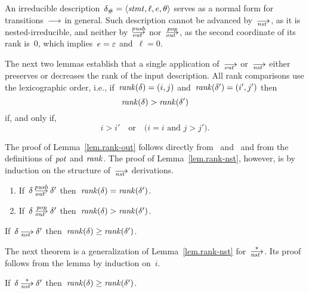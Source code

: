 An irreducible description~$\delta_\#=\<\stmt,\ell,e,\theta>$ serves as a
normal form for transitions~$\trans$ in general.  Such description cannot be
advanced by~$\nst$, as it is nested-irreducible, and neither by~$\outpush$
nor~$\outpop$, as the second coordinate of its rank is~0, which
implies~$e=\varepsilon$ and~$\ell=0$.

The next two lemmas establish that a single application of~$\out$ or~$\nst$
either preserves or decreases the rank of the input description.  All rank
comparisons use the lexicographic order, i.e., if~$\operatorname{\mathit{rank}}(\delta)=(i,j)$
and~$\operatorname{\mathit{rank}}(\delta')=(i',j')$ then
\[
  \operatorname{\mathit{rank}}(\delta)>\operatorname{\mathit{rank}}(\delta')
\]
if, and only if,
\[
  i>i'\quad\text{or}\quad\text{($i=i$ and $j>j'$)}.
\]

The proof of Lemma~\ref{lem.rank-out} follows directly from~
and~ and from the definitions of $\operatorname{\mathit{pot}}$ and $\operatorname{\mathit{rank}}$.  The proof of
Lemma~\ref{lem.rank-nst}, however, is by induction on the structure
of~$\nst$ derivations.

\begin{lemma}[label=lem.rank-out,restate=lemrankout]
  \strut
  \begin{enumerate}
  \item\label{lem.rank-out-push} If~$\delta\outpush\delta'$
    then~$\operatorname{\mathit{rank}}(\delta)=\operatorname{\mathit{rank}}(\delta')$.
  \item\label{lem.rank-out-pop} If~$\delta\outpop\delta'$
    then~$\operatorname{\mathit{rank}}(\delta)>\operatorname{\mathit{rank}}(\delta')$.
  \end{enumerate}
\end{lemma}

\begin{lemma}[label=lem.rank-nst,restate=lemranknst]
  If~$\delta\nst\delta'$ then~$\operatorname{\mathit{rank}}(\delta)\ge\operatorname{\mathit{rank}}(\delta')$.
\end{lemma}

The next theorem is a generalization of Lemma~\ref{lem.rank-nst}
for~$\nst[*]$.  Its proof follows from the lemma by induction on~$i$.

\begin{theorem}[label=thm.rank-nst-*,restate=thmranknstx]
  If~$\delta\nst[*]\delta'$ then~$\operatorname{\mathit{rank}}(\delta)\ge\operatorname{\mathit{rank}}(\delta')$.
\end{theorem}

